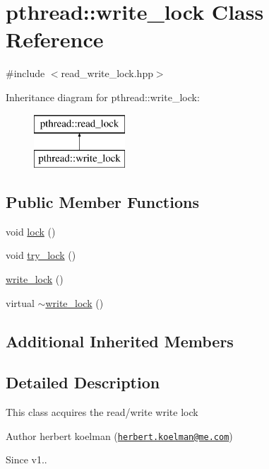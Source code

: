 \hypertarget{classpthread_1_1write__lock}{\section{pthread\+:\+:write\+\_\+lock Class Reference}
\label{classpthread_1_1write__lock}
}


{\ttfamily \#include $<$read\+\_\+write\+\_\+lock.\+hpp$>$}

Inheritance diagram for pthread\+:\+:write\+\_\+lock\+:\begin{figure}[H]
\begin{center}
\leavevmode
\includegraphics[height=2.000000cm]{classpthread_1_1write__lock}
\end{center}
\end{figure}
\subsection*{Public Member Functions}
\begin{DoxyCompactItemize}
\item 
void \hyperlink{classpthread_1_1write__lock_a04c5408a921144795bdf17062f72162e}{lock} ()
\item 
void \hyperlink{classpthread_1_1write__lock_a9a5a8dbafdd8b3ec3cad7c90df3ebd7b}{try\+\_\+lock} ()
\item 
\hyperlink{classpthread_1_1write__lock_a459624fbeb4a84a6a81d21753981e0ea}{write\+\_\+lock} ()
\item 
virtual \hyperlink{classpthread_1_1write__lock_a51627cb10bdb8fe024abf5b04a77fe1f}{$\sim$write\+\_\+lock} ()
\end{DoxyCompactItemize}
\subsection*{Additional Inherited Members}


\subsection{Detailed Description}
This class acquires the read/write write lock

\begin{DoxyAuthor}{Author}
herbert koelman (\href{mailto:herbert.koelman@me.com}{\tt herbert.\+koelman@me.\+com}) 
\end{DoxyAuthor}
\begin{DoxySince}{Since}
v1.. 
\end{DoxySince}


